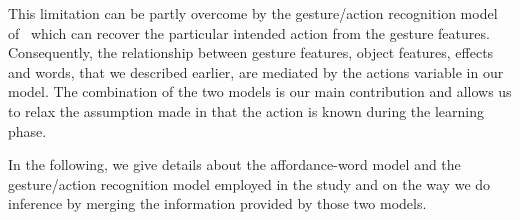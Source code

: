 This limitation can be partly overcome by the gesture/action recognition model of~\cite{saponaro:2013:crhri} which can recover the particular intended action from the gesture features.
Consequently, the relationship between gesture features, object features, effects and words, that we described earlier, are mediated by the actions variable in our model.
The combination of the two models is our main contribution and allows us to relax the assumption made in \cite{salvi:2012:smcb} that the action is known during the learning phase.

In the following, we give details about the affordance-word model and the gesture/action recognition model employed in the study and on the way we do inference by merging the information provided by those two models.





